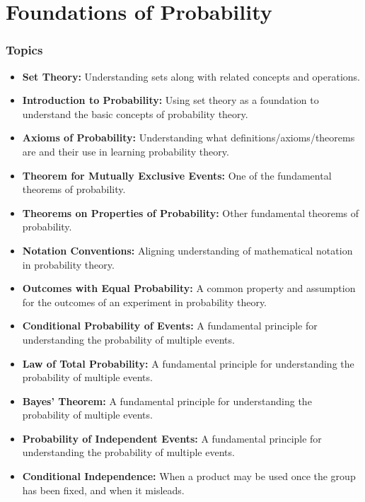 \section{Foundations of Probability}
\begin{frame}[t]
\frametitle{Topics}
\scriptsize
\vspace{-7mm}
    \begin{block}{}
        \begin{itemize}
            \item \textbf{Set Theory:} Understanding sets along with related concepts and operations.
            \item \textbf{Introduction to Probability:} Using set theory as a foundation to understand the basic concepts of probability theory.
            \item \textbf{Axioms of Probability:} Understanding what definitions/axioms/theorems are and their use in learning probability theory.
            \item \textbf{Theorem for Mutually Exclusive Events:} One of the fundamental theorems of probability.
            \item \textbf{Theorems on Properties of Probability:} Other fundamental theorems of probability.
            \item \textbf{Notation Conventions:} Aligning understanding of mathematical notation in probability theory.
            \item \textbf{Outcomes with Equal Probability:} A common property and assumption for the outcomes of an experiment in probability theory.
            \item \textbf{Conditional Probability of Events:} A fundamental principle for understanding the probability of multiple events.
            \item \textbf{Law of Total Probability:} A fundamental principle for understanding the probability of multiple events.
            \item \textbf{Bayes' Theorem:} A fundamental principle for understanding the probability of multiple events.
            \item \textbf{Probability of Independent Events:} A fundamental principle for understanding the probability of multiple events.
            \item \textbf{Conditional Independence:} When a product may be used once the group has been fixed, and when it misleads.
        \end{itemize}
    \end{block}
\end{frame}

